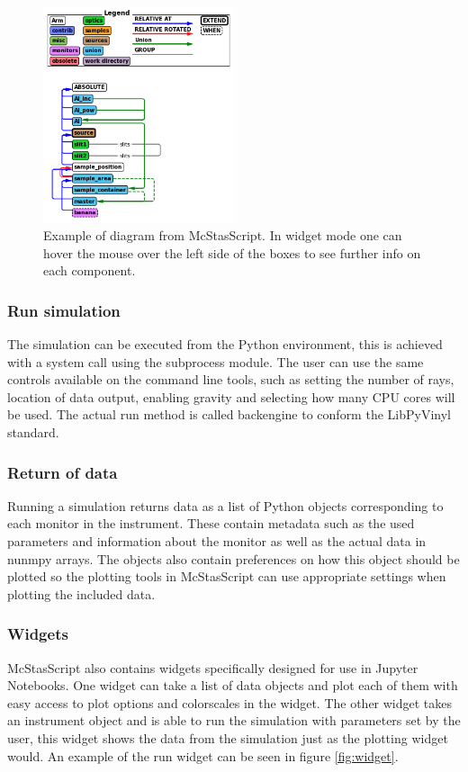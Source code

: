 \documentclass[11pt, a4paper]{article}
\begin{document}
\begin{figure}[h!!!]
\centering
\includegraphics[width=0.5\textwidth]{figures/diagram_example.png}
\caption{\label{fig:diagram}Example of diagram from McStasScript. In widget mode one can hover the mouse over the left side of the boxes to see further info on each component.}
\end{figure}

\subsubsection{Run simulation}
The simulation can be executed from the Python environment, this is achieved with a system call using the subprocess module. The user can use the same controls available on the command line tools, such as setting the number of rays, location of data output, enabling gravity and selecting how many CPU cores will be used. The actual run method is called backengine to conform the LibPyVinyl standard.

\subsubsection{Return of data}
Running a simulation returns data as a list of Python objects corresponding to each monitor in the instrument. These contain metadata such as the used parameters and information about the monitor as well as the actual data in nunmpy arrays. The objects also contain preferences on how this object should be plotted so the plotting tools in McStasScript can use appropriate settings when plotting the included data. 

\subsubsection{Widgets}
McStasScript also contains widgets specifically designed for use in Jupyter Notebooks. One widget can take a list of data objects and plot each of them with easy access to plot options and colorscales in the widget. The other widget takes an instrument object and is able to run the simulation with parameters set by the user, this widget shows the data from the simulation just as the plotting widget would. An example of the run widget can be seen in figure \ref{fig:widget}.
\end{document}
